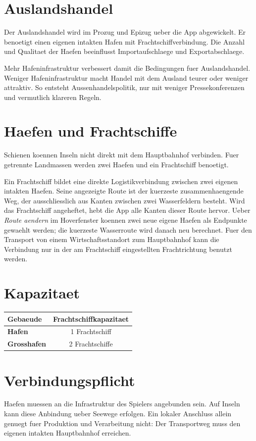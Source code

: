 \documentclass[11pt,a4paper,oneside,parskip=half]{scrreprt}
\begin{document}
\section{Auslandshandel}
Der Auslandshandel wird im Prozug und Epizug ueber die App abgewickelt. Er benoetigt einen eigenen intakten Hafen mit Frachtschiffverbindung. Die Anzahl und Qualitaet der Haefen beeinflusst Importaufschlaege und Exportabschlaege.

Mehr Hafeninfrastruktur verbessert damit die Bedingungen fuer Auslandshandel. Weniger Hafeninfrastruktur macht Handel mit dem Ausland teurer oder weniger attraktiv. So entsteht Aussenhandelspolitik, nur mit weniger Pressekonferenzen und vermutlich klareren Regeln.

\section{Haefen und Frachtschiffe}
Schienen koennen Inseln nicht direkt mit dem Hauptbahnhof verbinden. Fuer getrennte Landmassen werden zwei Haefen und ein Frachtschiff benoetigt.

Ein Frachtschiff bildet eine direkte Logistikverbindung zwischen zwei eigenen intakten Haefen. Seine angezeigte Route ist
der kuerzeste zusammenhaengende Weg, der ausschliesslich aus Kanten zwischen zwei
Wasserfeldern besteht. Wird das Frachtschiff angeheftet, hebt die App alle Kanten
dieser Route hervor. Ueber \emph{Route aendern} im Hoverfenster koennen zwei neue
eigene Haefen als Endpunkte gewaehlt werden; die kuerzeste Wasserroute wird danach
neu berechnet. Fuer den Transport von einem Wirtschaftsstandort zum Hauptbahnhof
kann die Verbindung nur in der am Frachtschiff eingestellten Frachtrichtung
benutzt werden.

\section{Kapazitaet}
\begin{center}
\begin{tabular}{>{\bfseries}l c}
\toprule
Gebaeude & Frachtschiffkapazitaet \\
\midrule
Hafen & 1 Frachtschiff \\
Grosshafen & 2 Frachtschiffe \\
\bottomrule
\end{tabular}
\end{center}

\section{Verbindungspflicht}
Haefen muessen an die Infrastruktur des Spielers angebunden sein. Auf Inseln kann
diese Anbindung ueber Seewege erfolgen. Ein lokaler Anschluss allein genuegt fuer
Produktion und Verarbeitung nicht: Der Transportweg muss den eigenen intakten
Hauptbahnhof erreichen.
\end{document}
